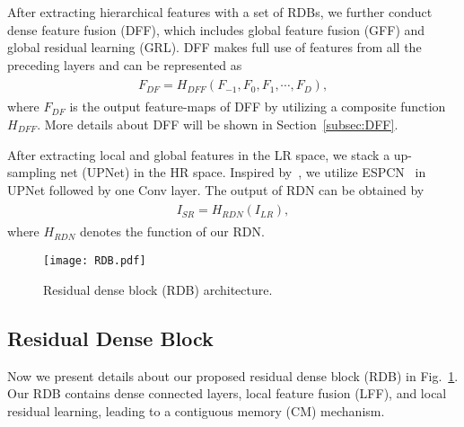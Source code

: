 \documentclass[10pt,twocolumn,letterpaper]{article}
\begin{document}
After extracting hierarchical features with a set of RDBs, we further conduct dense feature fusion (DFF), which includes global feature fusion (GFF) and global residual learning (GRL). DFF makes full use of features from all the preceding layers and can be represented as
\begin{align}
\begin{split}
\label{eq:DFF}
F_{DF}=H_{DFF}\left ( F_{-1},F_{0},F_{1},\cdots ,F_{D} \right ),
\end{split}
\end{align}  
where $F_{DF}$ is the output feature-maps of DFF by utilizing a composite function $H_{DFF}$. More details about DFF will be shown in Section~\ref{subsec:DFF}. 

After extracting local and global features in the LR space, we stack a up-sampling net (UPNet) in the HR space. Inspired by~\cite{lim2017enhanced}, we utilize ESPCN~\cite{shi2016real} in UPNet followed by one Conv layer. The output of RDN can be obtained by
\begin{align}
\begin{split}
\label{eq:I_SR}
I_{SR}=H_{RDN}\left ( I_{LR} \right ),
\end{split}
\end{align}  
where $H_{RDN}$ denotes the function of our RDN.
\begin{figure}[htpb]
\centering
\texttt{[image: RDB.pdf]}
\caption{Residual dense block (RDB) architecture.}
\label{fig:RDB} 
\vspace{-4mm} 
\end{figure}

\subsection{Residual Dense Block}
\label{subsec:RDB}
   
Now we present details about our proposed residual dense block (RDB) in Fig.~\ref{fig:RDB}. Our RDB contains dense connected layers, local feature fusion (LFF), and local residual learning, leading to a contiguous memory (CM) mechanism.     
\end{document}
